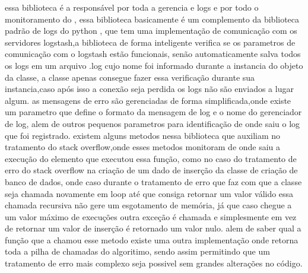 \documentclass[
	12pt,				%
	openright,			%
	oneside,			%
	a4paper,			%
	english,			%
	french,				%
	spanish,			%
	brazil,				%
	]{abntex2}
\begin{document}
essa biblioteca é a responsável por toda a gerencia e logs e por todo o monitoramento do ,
essa biblioteca basicamente é um complemento da biblioteca padrão de logs do python \cite{logging},
que tem uma implementação de comunicação com os servidores logstash,a biblioteca de forma inteligente verifica se os parametros de comunicação com o logstash estão funcionais,
senão automaticamente salva todos os logs em um arquivo .log cujo nome foi informado durante a instancia do objeto da classe,
a classe apenas consegue fazer essa verificação durante sua instancia,caso após isso a conexão seja perdida os logs não são enviados a lugar algum.
as mensagens de erro são gerenciadas de forma simplificada,onde existe um parametro que define o formato da mensagem de log e o nome do gerenciador de log,
alem de outros pequenos parametros para identificação de onde saiu o log que foi registrado.
existem alguns metodos nessa biblioteca que auxiliam no tratamento do stack overflow,onde esses metodos monitoram de onde saiu a execução do elemento que executou essa função,
como no caso do tratamento de erro do stack overflow na criação de um dado de inserção da classe de criação de banco de dados,
onde caso durante o tratamento de erro que faz com que a classe seja chamada novamente em loop até que consiga retornar um valor válido essa chamada recursiva não gere um esgotamento de memória,
já que caso chegue a um valor máximo de execuções outra exceção é chamada e simplesmente em vez de retornar um valor de inserção é retornado um valor nulo.
alem de saber qual a função que a chamou esse metodo existe uma outra implementação onde retorna toda a pilha de chamadas do algoritimo,
sendo assim permitindo que um tratamento de erro mais complexo seja possivel sem grandes alterações no código.
\end{document}
